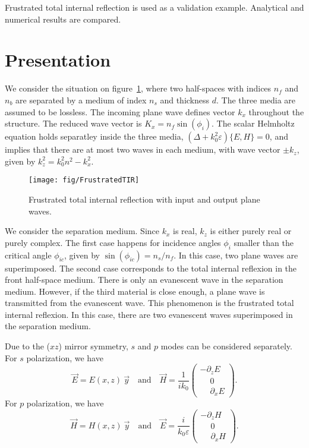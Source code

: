 

Frustrated total internal reflection is used as a validation example. 
Analytical and numerical results are compared.

\section{Presentation}

We consider the situation on figure~\ref{fig:FTIR}, where two half-spaces with indices $n_f$ and $n_b$ are separated by a medium of index $n_s$ and thickness $d$.
The three media are assumed to be lossless.
The incoming plane wave defines vector $k_x$ throughout the structure.
The reduced wave vector is $K_x=n_f \sin(\phi_i)$.
The scalar Helmholtz equation holds separatley inside the three media, 
$(\Delta+k_0^2 \varepsilon)\{E,H\}=0$,
and implies that there are at most two waves in each medium, with wave vector $\pm k_z$, given by $k_z^2 = k_0^2 n^2 - k_x^2$.

\begin{figure}[!h]
\texttt{[image: fig/FrustratedTIR]}
\caption{\label{fig:FTIR}Frustrated total internal reflection with input and output plane waves. }
\end{figure}

We consider the separation medium.
Since $k_x$ is real, $k_z$ is either purely real or purely complex.
The first case happens for incidence angles $\phi_i$ smaller than the critical angle $\phi_{ic}$, given by $\sin(\phi_{ic}) = n_s/n_f$.
In this case, two plane waves are superimposed.
The second case corresponds to the total internal reflexion in the front half-space medium. 
There is only an evanescent wave in the separation medium.
However, if the third material is close enough, a plane wave is transmitted from the evanescent wave.
This phenomenon is the frustrated total internal reflexion.
In this case, there are two evanescent waves superimposed in the separation medium.

Due to the ($xz$) mirror symmetry, $s$ and $p$ modes can be considered separately. 
For $s$ polarization, we have
$$
\vec E = E(x,z)\ \vec y
\quad\mathrm{and}\quad
\vec H = \frac{1}{i k_0} 
\begin{pmatrix}
-\partial_z E \\
\phantom{-} 0 \\
\phantom{-} \partial_x E
\end{pmatrix}.
$$
For $p$ polarization, we have
$$
\vec H = H(x,z)\ \vec y
\quad\mathrm{and}\quad
\vec E = \frac{i}{k_0 \varepsilon} 
\begin{pmatrix}
-\partial_z H \\
\phantom{-} 0 \\
\phantom{-} \partial_x H
\end{pmatrix}.
$$

